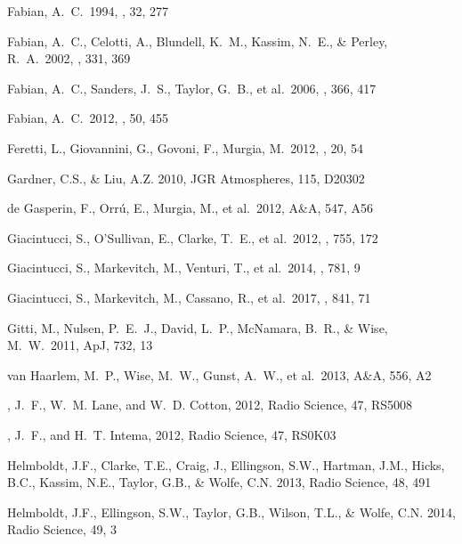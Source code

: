 \documentclass[11pt]{article}
\begin{document}
\begin{thebibliography}{}
 Fabian, A.~C.\ 1994, \araa, 32, 277 


 Fabian, A.~C., Celotti, A., Blundell, K.~M., Kassim, N.~E., \& Perley, R.~A.\ 2002, \mnras, 331, 369 

 Fabian, A.~C., Sanders, J.~S., Taylor, G.~B., et al.\ 2006, \mnras, 366, 417 

 Fabian, A.~C.\ 2012, \araa, 50, 455 


 Feretti, L., Giovannini, G., Govoni, F., Murgia, M.\ 2012, \aapr, 20, 54 

 Gardner, C.S., \& Liu, A.Z.
2010, JGR Atmospheres, 115, D20302

 de Gasperin, F., Orr{\'u}, E., Murgia, M., et al.\ 2012, A\&A, 547, A56

 Giacintucci, S., O'Sullivan, E., Clarke, T.~E., et al.\ 2012, \apj, 755, 172 

 Giacintucci, S., Markevitch, M., Venturi, T., et al.\ 2014, \apj, 781, 9 

 Giacintucci, S., Markevitch, M., Cassano, R., et al.\ 2017, \apj, 841, 71 

 Gitti, M., Nulsen,
P.~E.~J., David, L.~P., McNamara, B.~R.,
\& Wise, M.~W.\ 2011, ApJ, 732, 13

van Haarlem, M.~P., Wise, M.~W., Gunst, A.~W., et al.\ 2013, A\&A, 556, A2

, J.~F., W.~M. {Lane}, and W.~D. {Cotton}, 2012, Radio Science, 47, RS5008

, J.~F., and H.~T. {Intema}, 2012,
  Radio Science, 47, RS0K03

Helmboldt, J.F., Clarke, T.E., Craig, J., Ellingson, S.W., Hartman, J.M., Hicks, B.C., Kassim, N.E., Taylor, G.B., \& Wolfe, C.N. 2013, Radio Science, 48, 491 

Helmboldt, J.F., Ellingson, S.W., Taylor, G.B., Wilson, T.L., \& Wolfe, C.N.
2014, Radio Science, 49, 3


\end{thebibliography}
\end{document}
